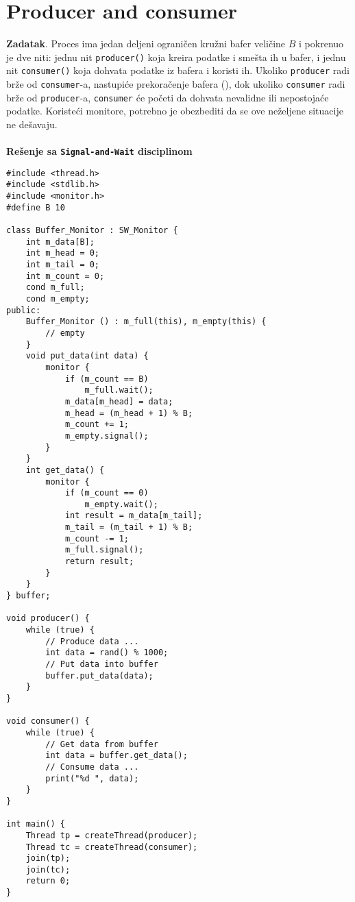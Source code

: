 \clearpage
\section{\latin Producer and consumer}
\textbf{\large Zadatak}. Proces ima jedan deljeni ograni\v{c}en kru\v{z}ni bafer veli\v{c}ine $B$ i pokrenuo je dve niti: jednu nit \texttt{producer()} koja kreira podatke i sme\v{s}ta ih u bafer, i jednu nit \texttt{consumer()} koja dohvata podatke iz bafera i koristi ih. Ukoliko \texttt{producer} radi br\v{z}e od \texttt{consumer}-a, nastupi\'{c}e prekora\v{c}enje bafera (), dok ukoliko \texttt{consumer} radi br\v{z}e od \texttt{producer}-a, \texttt{consumer} \'{c}e po\v{c}eti da dohvata nevalidne ili nepostoja\'{c}e podatke. Koriste\'{c}i monitore, potrebno je obezbediti da se ove ne\v{z}eljene situacije ne de\v{s}avaju.
\\\\
\textbf{Re\v{s}enje sa \texttt{Signal-and-Wait} disciplinom}
\begin{lstlisting}
#include <thread.h>
#include <stdlib.h>
#include <monitor.h>
#define B 10

class Buffer_Monitor : SW_Monitor {
    int m_data[B];
    int m_head = 0;
    int m_tail = 0;
    int m_count = 0;
    cond m_full;
    cond m_empty;
public:
    Buffer_Monitor () : m_full(this), m_empty(this) {
        // empty
    }
    void put_data(int data) {
        monitor {
            if (m_count == B)
                m_full.wait();
            m_data[m_head] = data;
            m_head = (m_head + 1) % B;
            m_count += 1;
            m_empty.signal();
        }
    }
    int get_data() {
        monitor {
            if (m_count == 0)
                m_empty.wait();
            int result = m_data[m_tail];
            m_tail = (m_tail + 1) % B;
            m_count -= 1;
            m_full.signal();
            return result;
        }
    }
} buffer;

void producer() {
    while (true) {
        // Produce data ...
        int data = rand() % 1000;
        // Put data into buffer
        buffer.put_data(data);
    }
}

void consumer() {
    while (true) {
        // Get data from buffer
        int data = buffer.get_data();
        // Consume data ...
        print("%d ", data);
    }
}

int main() {
    Thread tp = createThread(producer);
    Thread tc = createThread(consumer);
    join(tp);
    join(tc);
    return 0;
}

\end{lstlisting}
